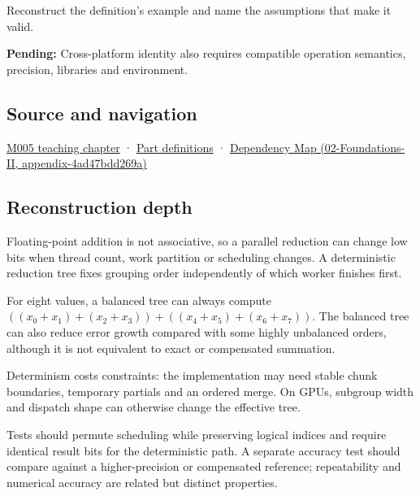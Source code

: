 Reconstruct the definition's example and name the assumptions that make it valid.

\textbf{Pending:} Cross-platform identity also requires compatible operation semantics, precision, libraries and environment.

\subsection{Source and navigation}\label{source-and-navigation}

\href{Continuous\%20Notes/Computing\%20Foundations\%20-\%20From\%20Bits\%20to\%20C++\%20and\%20Systems\%20APIs\#When\%20arithmetic\%20meets\%20uncertainty}{M005 teaching chapter} · \hyperref[appendix-fd090d982a15]{Part definitions} · \href{}{Dependency Map (02-Foundations-II, appendix-4ad47bdd269a)}

\subsection{Reconstruction depth}\label{reconstruction-depth}

Floating-point addition is not associative, so a parallel reduction can change low bits when thread count, work partition or scheduling changes. A deterministic reduction tree fixes grouping order independently of which worker finishes first.

For eight values, a balanced tree can always compute \(((x_0+x_1)+(x_2+x_3)) + ((x_4+x_5)+(x_6+x_7))\). The balanced tree can also reduce error growth compared with some highly unbalanced orders, although it is not equivalent to exact or compensated summation.

Determinism costs constraints: the implementation may need stable chunk boundaries, temporary partials and an ordered merge. On GPUs, subgroup width and dispatch shape can otherwise change the effective tree.

Tests should permute scheduling while preserving logical indices and require identical result bits for the deterministic path. A separate accuracy test should compare against a higher-precision or compensated reference; repeatability and numerical accuracy are related but distinct properties.
